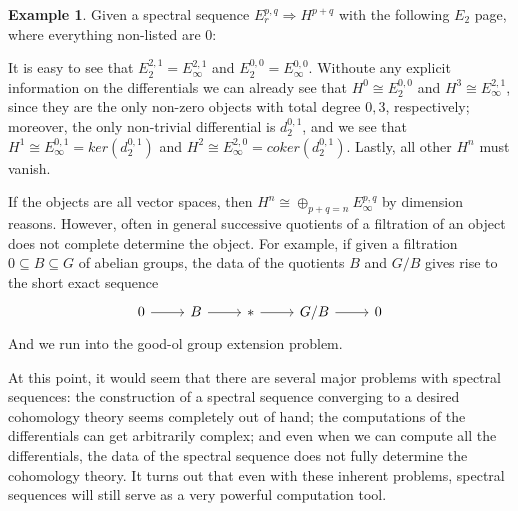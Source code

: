 \documentclass{article}
\theoremstyle{definition}
\theoremstyle{definition}
\theoremstyle{definition}
\theoremstyle{definition}
\theoremstyle{definition}
\theoremstyle{definition}
\newtheorem{example}{Example}[theorem]
\begin{document}
\begin{tcolorbox}[colback=yellow!5!white,colframe=yellow!30!white]
\begin{example}
	Given a spectral sequence $E_r^{p,q}\Longrightarrow H^{p+q}$ with the following $E_2$ page, where everything non-listed are $0$:

	It is easy to see that $E_{2}^{2,1}=E_{\infty}^{2,1}$ and $E_{2}^{0,0}=E_{\infty}^{0,0}$. Withoute any explicit information on the differentials we can already see that $H^0\cong E_{2}^{0,0}$ and $H^3\cong E_{\infty}^{2,1}$, since they are the only non-zero objects with total degree $0,3$, respectively; moreover, the only non-trivial differential is $d_2^{0,1}$, and we see that $H^1\cong E_{\infty}^{0,1}=ker(d_2^{0,1})$ and $H^2\cong E_{\infty}^{2,0}=coker(d_2^{0,1})$. Lastly, all other $H^n$ must vanish. 
	
	
	
\end{example}
\end{tcolorbox}



If the objects are all vector spaces, then $H^n\cong \oplus_{p+q=n} E_{\infty}^{p,q}$ by dimension reasons. However, often in general successive quotients of a filtration of an object does not complete determine the object. For example, if given a filtration $0\subseteq B\subseteq G$
of abelian groups, the data of the quotients $B$ and $G/B$ gives rise to the short exact sequence 
\[\begin{tikzcd}
0\arrow[r]&B\arrow[r]&*\arrow[r]&G/B\arrow[r]&0
\end{tikzcd}\]
And we run into the good-ol group extension problem. 

At this point, it would seem that there are several major problems with spectral sequences: the construction of a spectral sequence converging to a desired cohomology theory seems completely out of hand; the computations of the differentials can get arbitrarily complex; and even when we can compute all the differentials, the data of the spectral sequence does not fully determine the cohomology theory. It turns out that even with these inherent problems, spectral sequences will still serve as a very powerful computation tool.
\end{document}

